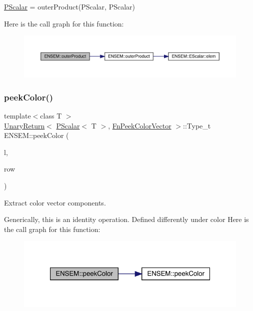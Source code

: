 \mbox{\hyperlink{classENSEM_1_1PScalar}{P\+Scalar}} = outer\+Product(\+P\+Scalar, P\+Scalar) 

Here is the call graph for this function\+:\nopagebreak
\begin{figure}[H]
\begin{center}
\leavevmode
\includegraphics[width=350pt]{db/dcc/group__primscalar_gaa87ddc7f8a5ec9fc1cb807c54d727128_cgraph}
\end{center}
\end{figure}
\mbox{\label{group__primscalar_ga99ea9420e1cb79a4dbc92fd7aab84f80}} 
\subsubsection{\texorpdfstring{peekColor()}{peekColor()}\hspace{0.1cm}{\footnotesize\ttfamily [1/2]}}
{\footnotesize\ttfamily template$<$class T $>$ \\
\mbox{\hyperlink{structENSEM_1_1UnaryReturn}{Unary\+Return}}$<$ \mbox{\hyperlink{classENSEM_1_1PScalar}{P\+Scalar}}$<$ T $>$, \mbox{\hyperlink{structENSEM_1_1FnPeekColorVector}{Fn\+Peek\+Color\+Vector}} $>$\+::Type\+\_\+t E\+N\+S\+E\+M\+::peek\+Color (\begin{DoxyParamCaption}\item[{const \mbox{\hyperlink{classENSEM_1_1PScalar}{P\+Scalar}}$<$ T $>$ \&}]{l,  }\item[{int}]{row }\end{DoxyParamCaption})\hspace{0.3cm}{\ttfamily [inline]}}



Extract color vector components. 

Generically, this is an identity operation. Defined differently under color Here is the call graph for this function\+:\nopagebreak
\begin{figure}[H]
\begin{center}
\leavevmode
\includegraphics[width=321pt]{db/dcc/group__primscalar_ga99ea9420e1cb79a4dbc92fd7aab84f80_cgraph}
\end{center}
\end{figure}
\mbox{\label{group__primscalar_ga5e0077638719795b3ad6bba20ddb9d4d}} 
